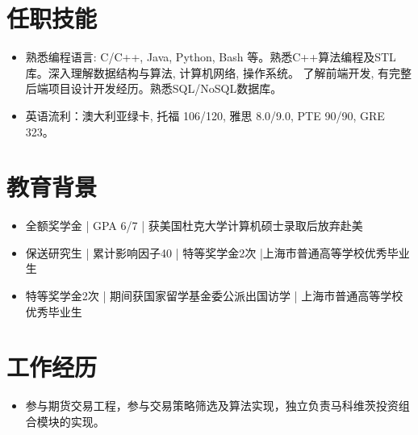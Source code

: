 \documentclass{resume}
\begin{document}
\section{任职技能}
\begin{itemize}
    \item 熟悉编程语言: C/C++, Java, Python, Bash 等。熟悉C++算法编程及STL库。深入理解数据结构与算法, 计算机网络, 操作系统。
    了解前端开发, 有完整后端项目设计开发经历。熟悉SQL/NoSQL数据库。
    \item 英语流利：澳大利亚绿卡, 托福 106/120, 雅思 8.0/9.0, PTE 90/90, GRE 323。
\end{itemize}

\section{教育背景}
\begin{itemize}
\item 全额奖学金 | GPA 6/7 | 获美国杜克大学计算机硕士录取后放弃赴美 
\end{itemize}

\begin{itemize}
\item 保送研究生 | 累计影响因子40 | 特等奖学金2次 |上海市普通高等学校优秀毕业生
\end{itemize}

\begin{itemize}
\item 特等奖学金2次 | 期间获国家留学基金委公派出国访学 | 上海市普通高等学校优秀毕业生
\end{itemize}


\section{工作经历}
\begin{itemize}
  \item 参与期货交易工程，参与交易策略筛选及算法实现，独立负责马科维茨投资组合模块的实现。
\end{itemize}
\end{document}
